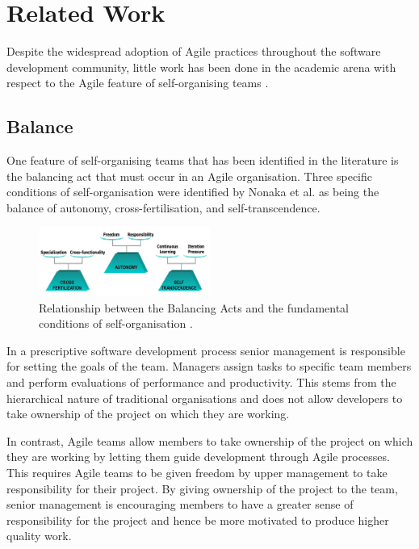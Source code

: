 \documentclass[conference]{IEEEtran}
\begin{document}
\section{Related Work}\label{relwork}

Despite the widespread adoption of Agile practices throughout the software
development community, little work has been done in the academic arena with
respect to the Agile feature of self-organising teams \cite{hoda2010balancing}.

\subsection{Balance}

One feature of self-organising teams that has been identified in the literature
is the balancing act that must occur in an Agile organisation. Three specific
conditions of self-organisation were identified by Nonaka et al.
\cite{takeuchi1986new} as being the balance of autonomy, cross-fertilisation,
and self-transcendence.

\begin{figure}[ht!]   \centering
\includegraphics[width=0.5\textwidth]{balancing.png}   \caption{Relationship
between the Balancing Acts and the fundamental conditions of self-organisation
\cite{hoda2010balancing}.} \end{figure}

In a prescriptive software development process senior management is responsible
for setting the goals of the team. Managers assign tasks to specific team
members and perform evaluations of performance and productivity. This stems from
the hierarchical nature of traditional organisations and does not allow
developers to take ownership of the project on which they are working.

In contrast, Agile teams allow members to take ownership of the project on which
they are working by letting them guide development through Agile processes. This
requires Agile teams to be given freedom by upper management to take
responsibility for their project. By giving ownership of the project to the
team, senior management is encouraging members to have a greater sense of
responsibility for the project and hence be more motivated to produce higher
quality work.
\end{document}
